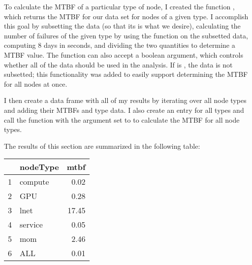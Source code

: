 To calculate the MTBF of a particular type of node, I created the function , which returns the MTBF for our data set for nodes of a given type.  I accomplish this goal by subsetting the data (so that its  is what we desire), calculating the number of failures of the given type by using the  function on the subsetted data, computing 8 days in seconds, and dividing the two quantities to determine a MTBF value.  The function can also accept a boolean  argument, which controls whether all of the data should be used in the analysis.  If  is , the data is not subsetted; this functionality was added to easily support determining the MTBF for all nodes at once.

I then create a data frame with all of my results by iterating over all node types and adding their MTBFs and type data.  I also create an entry for all types and call the  function with the  argument set to  to calculate the MTBF for all node types.

The results of this section are summarized in the following table:

\begin{table}[ht]
\centering
\begin{tabular}{rlr}
  \hline
 & nodeType & mtbf \\ 
  \hline
1 & compute & 0.02 \\ 
  2 & GPU & 0.28 \\ 
  3 & lnet & 17.45 \\ 
  4 & service & 0.05 \\ 
  5 & mom & 2.46 \\ 
  6 & ALL & 0.01 \\ 
   \hline
\end{tabular}
\end{table}
